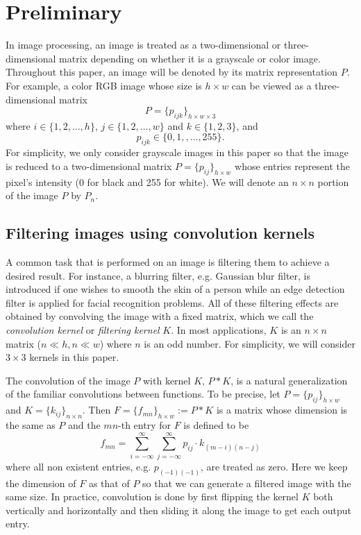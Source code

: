 \documentclass[12pt]{amsart}
\theoremstyle{definition}
\theoremstyle{remark}
\numberwithin{thm}{section}
\begin{document}

\section{Preliminary}
In image processing, an image is treated as a two-dimensional or three-dimensional matrix depending on whether it is a grayscale or color image. Throughout this paper, an image will be denoted by its matrix representation $P$. For example, a color RGB image whose size is $h\times w$ can be viewed as a three-dimensional matrix 
\[P=\{p_{ijk}\}_{h\times w\times 3}\] 
where  $i\in\{1,2,\dots,h\}$, $j\in\{1,2,\dots,w\}$ and $k\in\{1,2,3\}$, and
\[p_{ijk}\in\{0,1,,\dots,255\}.\]
For simplicity, we only consider grayscale images in this paper so that the image is reduced to a two-dimensional matrix $P=\{p_{ij}\}_{h\times w}$ whose entries represent the pixel's intensity (0 for black and 255 for white). We will denote an $n\times n$ portion of the image $P$ by $P_n$. 

\subsection{Filtering images using convolution kernels}
A common task that is performed on an image is filtering them to achieve a desired result. For instance, a blurring filter, e.g. Gaussian blur filter, is introduced if one wishes to smooth the skin of a person while an edge detection filter is applied for facial recognition problems. All of these filtering effects are obtained by convolving the image with a fixed matrix, which we call the \emph{convolution kernel} or \emph{filtering kernel} $K$. In most applications, $K$ is an $n\times n$ matrix ($n\ll h, n\ll w$) where $n$ is an odd number. For simplicity, we will consider $3\times 3$ kernels in this paper.

The convolution of the image $P$ with kernel $K$, $P*K$, is a natural generalization of the familiar convolutions between functions. To be precise, let $P=\{p_{ij}\}_{h\times w}$ and $K=\{k_{ij}\}_{n\times n}$. Then $F=\{f_{mn}\}_{h\times w}:= P*K$ is a matrix whose dimension is the same as $P$ and the $mn$-th entry for $F$ is defined to be 
\[f_{mn}=\sum_{i=-\infty}^{\infty}\sum_{j=-\infty}^{\infty}p_{ij}\cdot k_{(m-i)(n-j)}\]
where all non existent entries, e.g. $p_{(-1)(-1)}$, are treated as zero. Here we keep the dimension of $F$ as that of $P$ so that we can generate a filtered image with the same size. In practice, convolution is done by first flipping the kernel $K$ both vertically and horizontally and then sliding it along the image to get each output entry. 
\end{document}
